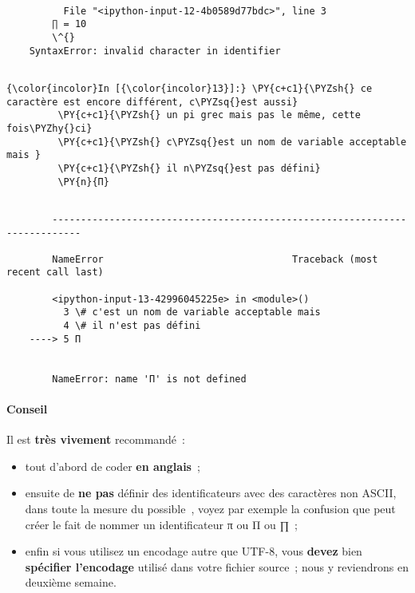     \begin{Verbatim}[commandchars=\\\{\}]

          File "<ipython-input-12-4b0589d77bdc>", line 3
        ∏ = 10
        \^{}
    SyntaxError: invalid character in identifier


    \end{Verbatim}

    \begin{Verbatim}[commandchars=\\\{\}]
{\color{incolor}In [{\color{incolor}13}]:} \PY{c+c1}{\PYZsh{} ce caractère est encore différent, c\PYZsq{}est aussi}
         \PY{c+c1}{\PYZsh{} un pi grec mais pas le même, cette fois\PYZhy{}ci}
         \PY{c+c1}{\PYZsh{} c\PYZsq{}est un nom de variable acceptable mais }
         \PY{c+c1}{\PYZsh{} il n\PYZsq{}est pas défini}
         \PY{n}{Π}
\end{Verbatim}


    \begin{Verbatim}[commandchars=\\\{\}]

        ---------------------------------------------------------------------------

        NameError                                 Traceback (most recent call last)

        <ipython-input-13-42996045225e> in <module>()
          3 \# c'est un nom de variable acceptable mais
          4 \# il n'est pas défini
    ----> 5 Π
    

        NameError: name 'Π' is not defined

    \end{Verbatim}

    \hypertarget{conseil}{%
\paragraph{Conseil}\label{conseil}}

Il est \textbf{très vivement} recommandé~:

\begin{itemize}
\tightlist
\item
  tout d'abord de coder \textbf{en anglais}~;
\item
  ensuite de \textbf{ne pas} définir des identificateurs avec des
  caractères non ASCII, dans toute la mesure du possible~, voyez par
  exemple la confusion que peut créer le fait de nommer un
  identificateur π ou Π ou ∏~;
\item
  enfin si vous utilisez un encodage autre que UTF-8, vous
  \textbf{devez} bien \textbf{spécifier l'encodage} utilisé dans votre
  fichier source~; nous y reviendrons en deuxième semaine.
\end{itemize}

